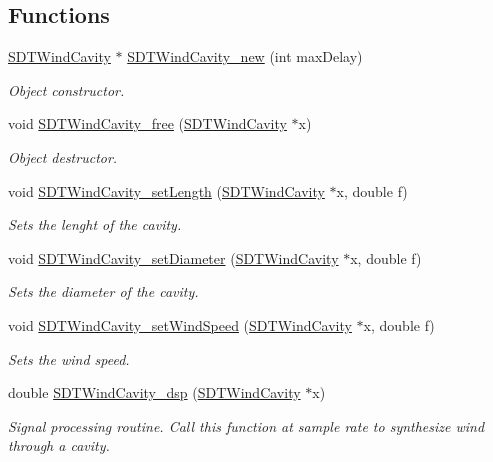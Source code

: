 \subsection*{Functions}
\begin{DoxyCompactItemize}
\item 
\hyperlink{group__windcavity_gab89dab8c4a56cb2ae4aa501ddfd38466}{S\+D\+T\+Wind\+Cavity} $\ast$ \hyperlink{group__windcavity_ga43d1e1b7f9f6805028ee6ae1fdd65259}{S\+D\+T\+Wind\+Cavity\+\_\+new} (int max\+Delay)
\begin{DoxyCompactList}\small\item\em Object constructor. \end{DoxyCompactList}\item 
void \hyperlink{group__windcavity_ga9008aba40c8c6cb64d02ee1e0d684ea8}{S\+D\+T\+Wind\+Cavity\+\_\+free} (\hyperlink{group__windcavity_gab89dab8c4a56cb2ae4aa501ddfd38466}{S\+D\+T\+Wind\+Cavity} $\ast$x)
\begin{DoxyCompactList}\small\item\em Object destructor. \end{DoxyCompactList}\item 
void \hyperlink{group__windcavity_gaef77096c3a3f373028523cc5a677421f}{S\+D\+T\+Wind\+Cavity\+\_\+set\+Length} (\hyperlink{group__windcavity_gab89dab8c4a56cb2ae4aa501ddfd38466}{S\+D\+T\+Wind\+Cavity} $\ast$x, double f)
\begin{DoxyCompactList}\small\item\em Sets the lenght of the cavity. \end{DoxyCompactList}\item 
void \hyperlink{group__windcavity_gaeab62d14a0f417bd9189ae7f53bfa11d}{S\+D\+T\+Wind\+Cavity\+\_\+set\+Diameter} (\hyperlink{group__windcavity_gab89dab8c4a56cb2ae4aa501ddfd38466}{S\+D\+T\+Wind\+Cavity} $\ast$x, double f)
\begin{DoxyCompactList}\small\item\em Sets the diameter of the cavity. \end{DoxyCompactList}\item 
void \hyperlink{group__windcavity_ga947ec140c066f2bb6520215880de1fbc}{S\+D\+T\+Wind\+Cavity\+\_\+set\+Wind\+Speed} (\hyperlink{group__windcavity_gab89dab8c4a56cb2ae4aa501ddfd38466}{S\+D\+T\+Wind\+Cavity} $\ast$x, double f)
\begin{DoxyCompactList}\small\item\em Sets the wind speed. \end{DoxyCompactList}\item 
double \hyperlink{group__windcavity_gac7243f85f382566893437c60c81d433c}{S\+D\+T\+Wind\+Cavity\+\_\+dsp} (\hyperlink{group__windcavity_gab89dab8c4a56cb2ae4aa501ddfd38466}{S\+D\+T\+Wind\+Cavity} $\ast$x)
\begin{DoxyCompactList}\small\item\em Signal processing routine. Call this function at sample rate to synthesize wind through a cavity. \end{DoxyCompactList}\end{DoxyCompactItemize}


